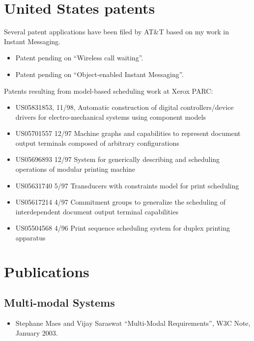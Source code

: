\documentclass{article}
\begin{document}
\section*{United States patents}

Several patent applications have been filed by AT\&T based on my work
in Instant Messaging.

\begin{itemize}
\item  Patent pending on ``Wireless call waiting''.
\item  Patent pending on ``Object-enabled Instant Messaging''.
\end{itemize}

Patents resulting from model-based scheduling work at Xerox PARC:
\begin{itemize}
\item   US05831853, 11/98, Automatic construction of digital
  controllers/device drivers for electro-mechanical systems using
  component models

\item   US05701557 12/97 Machine graphs and capabilities to represent
  document output terminals composed of arbitrary configurations

\item  US05696893 12/97 System for generically describing and
  scheduling operations of modular printing machine

\item  US05631740 5/97 Transducers with constraints model for print
  scheduling

\item  US05617214 4/97 Commitment groups to generalize the scheduling
  of interdependent document output terminal capabilities

\item  US05504568 4/96 Print sequence scheduling system for duplex
  printing apparatus
\end{itemize}


\section*{Publications}
\subsection*{Multi-modal Systems}
\begin{itemize}
\item Stephane Maes and Vijay Saraswat ``Multi-Modal Requirements'', 
W3C Note, January 2003.
\end{itemize}				   
\end{document}
